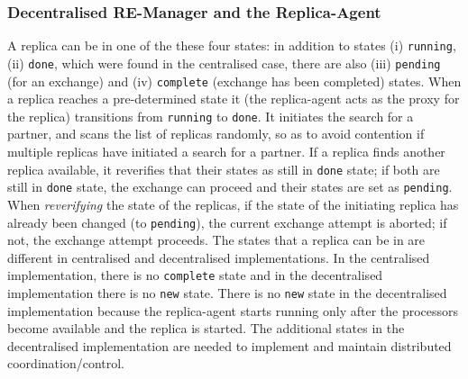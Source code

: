 \documentclass{rspublic}
\newcommand{\jhanote}[1]{ {\textcolor{red} { ***shantenu: #1 }}}
\newcommand{\alnote}[1]{ {\textcolor{blue} { ***andre: #1 }}}
\newcommand{\alnote}[1]{}
\newcommand{\jhanote}[1]{}
\begin{document}



\subsubsection{Decentralised RE-Manager and the Replica-Agent}

 
A replica can be in one of the these four states: in addition to
states (i) \texttt{running}, (ii) \texttt{done}, which were found in
the centralised case, there are also (iii) \texttt{pending} (for an
exchange) and (iv) \texttt{complete} (exchange has been completed)
states.  When a replica reaches a pre-determined state it (the
replica-agent acts as the proxy for the replica) transitions from
\texttt{running} to \texttt{done}. It initiates the search for a
partner, and scans the list of replicas randomly, so as to avoid
contention if multiple replicas have initiated a search for a partner.
If a replica finds another replica available, it reverifies that their
states as still in \texttt{done} state; if both are still in
\texttt{done} state, the exchange can proceed and their states are set
as \texttt{pending}.  When {\it reverifying} the state of the
replicas, if the state of the initiating replica has already been
changed (to \texttt{pending}), the current exchange attempt is
aborted; if not, the exchange attempt proceeds. The states that a
replica can be in are different in centralised and decentralised
implementations. In the centralised implementation, there is no
\texttt{complete} state and in the decentralised implementation there
is no \texttt{new} state. There is no \texttt{new} state in the
decentralised implementation because the replica-agent starts running
only after the processors become available and the replica is
started. The additional states in the decentralised implementation are
needed to implement and maintain distributed coordination/control.
\end{document}
